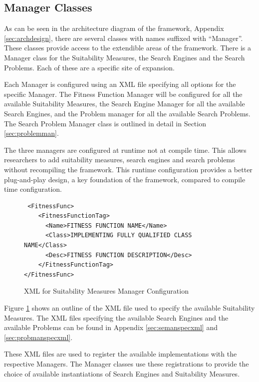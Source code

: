 \subsection{Manager Classes}
\label{sec:manclasses}
As can be seen in the architecture diagram of the framework, Appendix \ref{sec:archdesign}, there are several classes with names suffixed with ``Manager''.
These classes provide access to the extendible areas of the framework.
There is a Manager class for the Suitability Measures, the Search Engines and the Search Problems.
Each of these are a specific site of expansion.

Each Manager is configured using an XML file specifying all options for the specific Manager.
The Fitness Function Manager will be configured for all the available Suitability Measures, the Search Engine Manager for all the available Search Engines, and the Problem manager for all the available Search Problems.
The Search Problem Manager class is outlined in detail in Section \ref{sec:problemman}.

The three managers are configured at runtime not at compile time.
This allows researchers to add suitability measures, search engines and search problems without recompiling the framework.
This runtime configuration provides a better plug-and-play design, a key foundation of the framework, compared to compile time configuration.

\lstset{language=XML}
\begin{figure}
\begin{lstlisting}
 <FitnessFunc>
	<FitnessFunctionTag>
	  <Name>FITNESS FUNCTION NAME</Name>
	  <Class>IMPLEMENTING FULLY QUALIFIED CLASS NAME</Class>
	  <Desc>FITNESS FUNCTION DESCRIPTION</Desc>
	</FitnessFunctionTag>
</FitnessFunc>
\end{lstlisting}
\caption{XML for Suitability Measures Manager Configuration}
\label{code:fitfuntmanconfig}
\end{figure}

Figure \ref{code:fitfuntmanconfig} shows an outline of the XML file used to specify the available Suitability Measures.
The XML files specifying the available Search Engines and the available Problems can be found in Appendix \ref{sec:semanspecxml} and \ref{sec:probmanspecxml}.

These XML files are used to register the available implementations with the respective Managers.
The Manager classes use these registrations to provide the choice of available instantiations of Search Engines and Suitability Measures.

